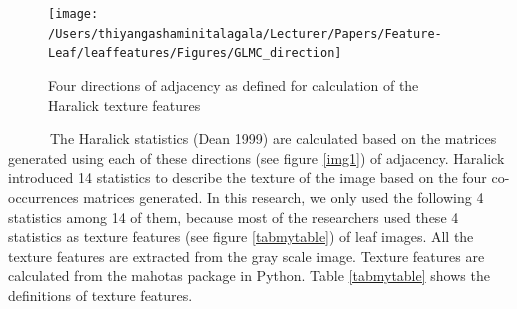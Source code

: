 \documentclass{article}
\begin{document}
\begin{figure}[!ht]

{\centering \texttt{[image: /Users/thiyangashaminitalagala/Lecturer/Papers/Feature-Leaf/leaffeatures/Figures/GLMC\_direction]} 

}

\caption{\label{direction}Four directions of adjacency as defined for calculation of the Haralick texture features}\label{fig:unnamed-chunk-24}
\end{figure}

~~~~~~The Haralick statistics (Dean 1999) are calculated based on the
matrices generated using each of these directions (see figure
\ref{img1}) of adjacency. Haralick introduced 14 statistics to describe
the texture of the image based on the four co-occurrences matrices
generated. In this research, we only used the following 4 statistics
among 14 of them, because most of the researchers used these 4
statistics as texture features (see figure \ref{tabmytable}) of leaf
images. All the texture features are extracted from the gray scale
image. Texture features are calculated from the mahotas package in
Python. Table \ref{tabmytable} shows the definitions of texture
features.
\end{document}
